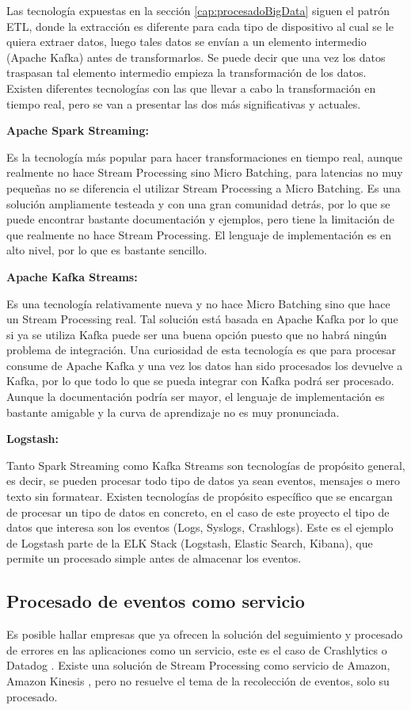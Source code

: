 Las tecnología expuestas en la sección \ref{cap:procesadoBigData} siguen el patrón ETL, donde la extracción es diferente para cada tipo de dispositivo al cual se le quiera extraer datos, luego tales datos se envían a un elemento intermedio (Apache Kafka) antes de transformarlos. Se puede decir que una vez los datos traspasan tal elemento intermedio empieza la transformación de los datos. Existen diferentes tecnologías con las que llevar a cabo la transformación en tiempo real, pero se van a presentar las dos más significativas y actuales.


\textbf{Apache Spark Streaming:}

Es la tecnología más popular para hacer transformaciones en tiempo real, aunque realmente no hace Stream Processing sino Micro Batching, para latencias no muy pequeñas no se diferencia el utilizar Stream Processing a Micro Batching. Es una solución ampliamente testeada y con una gran comunidad detrás, por lo que se puede encontrar bastante documentación y ejemplos, pero tiene la limitación de que realmente no hace Stream Processing. El lenguaje de implementación es en alto nivel, por lo que es bastante sencillo.

\textbf{Apache Kafka Streams:}

Es una tecnología relativamente nueva y no hace Micro Batching sino que hace un Stream Processing real. Tal solución está basada en Apache Kafka por lo que si ya se utiliza Kafka puede ser una buena opción puesto que no habrá ningún problema de integración. Una curiosidad de esta tecnología es que para procesar consume de Apache Kafka y una vez los datos han sido procesados los devuelve a Kafka, por lo que todo lo que se pueda integrar con Kafka podrá ser procesado. Aunque la documentación podría ser mayor, el lenguaje de implementación es bastante amigable y la curva de aprendizaje no es muy pronunciada.

\textbf{Logstash:}

Tanto Spark Streaming como Kafka Streams son tecnologías de propósito general, es decir, se pueden procesar todo tipo de datos ya sean eventos, mensajes o mero texto sin formatear. Existen tecnologías de propósito específico que se encargan de procesar un tipo de datos en concreto, en el caso de este proyecto el tipo de datos que interesa son los eventos (Logs, Syslogs, Crashlogs). Este es el ejemplo de Logstash parte de la ELK Stack (Logstash, Elastic Search, Kibana), que permite un procesado simple antes de almacenar los eventos.


\subsection{Procesado de eventos como servicio}
Es posible hallar empresas que ya ofrecen la solución del seguimiento y procesado de errores en las aplicaciones como un servicio, este es el caso de Crashlytics \cite{Tfg:crashlytics} o Datadog \cite{Tfg:datadog}. Existe una solución de Stream Processing como servicio de Amazon, Amazon Kinesis \cite{Tfg:kinesis}, pero no resuelve el tema de la recolección de eventos, solo su procesado.

